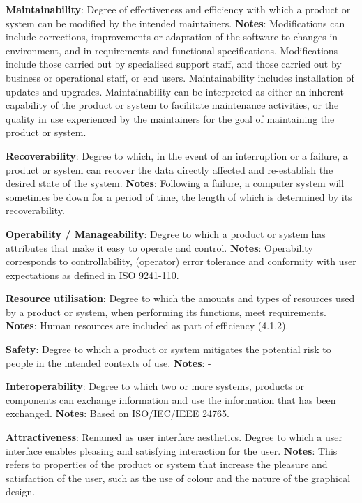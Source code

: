 \textbf{Maintainability}: Degree of effectiveness and efficiency with which a product or system can be modified by the intended maintainers. \textbf{Notes}: Modifications can include corrections, improvements or adaptation of the software to changes in environment, and in requirements and functional specifications. Modifications include those carried out by specialised support staff, and those carried out by business or operational staff, or end users. Maintainability includes installation of updates and upgrades. Maintainability can be interpreted as either an inherent capability of the product or system to facilitate maintenance activities, or the quality in use experienced by the maintainers for the goal of maintaining the product or system.

\textbf{Recoverability}: Degree to which, in the event of an interruption or a failure, a product or system can recover the data directly affected and re-establish the desired state of the system. \textbf{Notes}: Following a failure, a computer system will sometimes be down for a period of time, the length of which is determined by its recoverability.

\textbf{Operability / Manageability}: Degree to which a product or system has attributes that make it easy to operate and control. \textbf{Notes}: Operability corresponds to controllability, (operator) error tolerance and conformity with user expectations as defined in ISO 9241-110.

\textbf{Resource utilisation}: Degree to which the amounts and types of resources used by a product or system, when performing its functions, meet requirements. \textbf{Notes}: Human resources are included as part of efficiency (4.1.2).

\textbf{Safety}: Degree to which a product or system mitigates the potential risk to people in the intended contexts of use. \textbf{Notes}: -

\textbf{Interoperability}: Degree to which two or more systems, products or components can exchange information and use the information that has been exchanged. \textbf{Notes}: Based on ISO/IEC/IEEE 24765.

\textbf{Attractiveness}: Renamed as user interface aesthetics. Degree to which a user interface enables pleasing and satisfying interaction for the user. \textbf{Notes}: This refers to properties of the product or system that increase the pleasure and satisfaction of the user, such as the use of colour and the nature of the graphical design.

